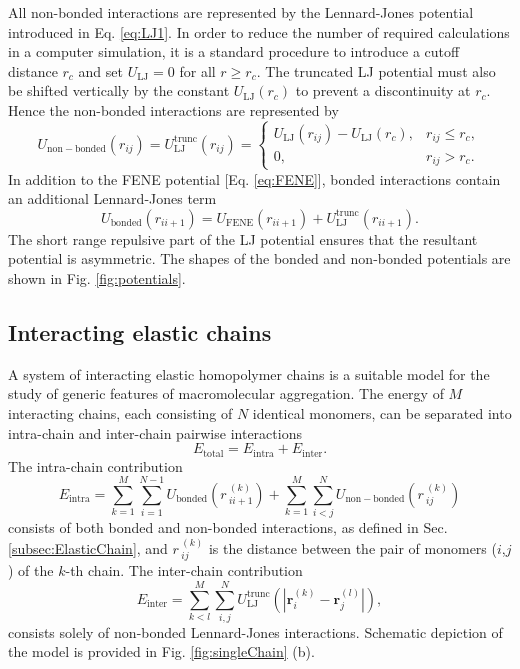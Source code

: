 \documentclass[12pt]{report}
\begin{document}
All non-bonded interactions are represented by the Lennard-Jones potential introduced in Eq. \ref{eq:LJ1}. In order to reduce the number of required calculations in a computer simulation, it is a standard procedure to introduce a cutoff distance $r_{c}$ and set $U_{\mathrm{LJ}} = 0$ for all $r\geq r_{c}$. The truncated LJ potential must also be shifted vertically by the constant $U_{\mathrm{LJ}}(r_{c})$ to prevent a discontinuity at $r_{c}$. Hence the non-bonded interactions are represented by
%
\begin{equation}
\label{eq:LJTruncated}
U_{\mathrm{non-bonded}}(r_{ij}) = U_{\mathrm{LJ}}^{\mathrm{trunc}}(r_{ij}) =  \begin{cases}
U_{\mathrm{LJ}}(r_{ij}) -  U_{\mathrm{LJ}}(r_{c}), &
r_{ij} \leq r_{c},\\
0, &   r_{ij} > r_{c}. \end{cases}
\end{equation}
%
In addition to the FENE potential [Eq.\,\,\ref{eq:FENE}], bonded interactions contain an additional Lennard-Jones term
%
\begin{equation}
U_{\mathrm{bonded}}(r_{ii+1})= U_{\mathrm{FENE}}(r_{ii+1}) +  U_{\mathrm{LJ}}^{\mathrm{trunc}}(r_{ii+1}).
\end{equation}
%
The short range repulsive part of the LJ potential ensures that the resultant potential is asymmetric. The shapes of the bonded and non-bonded potentials are shown in Fig. \ref{fig:potentials}. 


\subsection{Interacting elastic chains}
A system of interacting elastic homopolymer chains is a suitable model for the study of generic features of macromolecular aggregation. The energy of $M$ interacting chains, each consisting of $N$ identical monomers, can be separated into intra-chain and inter-chain pairwise interactions
%
\begin{equation}
E_{\mathrm{total}} = E_{\mathrm{intra}} + E_{\mathrm{inter}}.
\end{equation}
%
The intra-chain contribution 
\begin{equation}
E_{\mathrm{intra}} = \sum^{M}_{k = 1}\sum^{N-1}_{i = 1}
U_{\mathrm{bonded}}(r\,^{(k)}_{ii+1}) +
\sum^{M}_{k=1}\sum^{N}_{i<j}
U_{\mathrm{non-bonded}}(r\,^{(k)}_{ij})
\end{equation}
%
consists of both bonded and non-bonded interactions, as defined in Sec.\,\,\ref{subsec:ElasticChain}, and $r\,^{(k)}_{ij}$ is the distance between the pair of monomers ($i$,$j$) of the $k$-th chain. The inter-chain contribution
\begin{equation}
E_{\mathrm{inter}} = \sum^{M}_{k < l}
\sum^{N}_{i,j}U_{\mathrm{LJ}}^{\mathrm{trunc}}(|\textbf{r}^{(k)}_{i}
- \textbf{r}^{(l)}_{j}|),
\end{equation}
%
consists solely of non-bonded Lennard-Jones interactions. Schematic depiction of the model is provided in Fig.\,\,\ref{fig:singleChain}\,\,(b).
\end{document}
